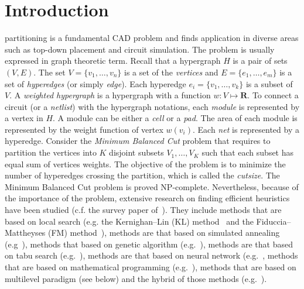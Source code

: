 \documentclass[journal]{IEEEtran}
\begin{document}
\section{Introduction}
 partitioning is a fundamental CAD problem and
finds application in diverse areas such as top-down placement and
circuit simulation. The problem is usually expressed in graph theoretic
term. Recall that a hypergraph $H$ is a pair of sets $(V,E)$. The set 
$V=\{v_1, \ldots, v_n\}$ is a set of the {\it vertices}  
and $E=\{e_1, \ldots, e_m\}$ is a set of {\it hyperedges} (or simply
{\it edge}). Each hyperedge $e_i = \{v_1, \ldots, v_k\}$ is a subset of
$V$. A {\it weighted hypergraph} is
a hypergraph with a function $w: V \mapsto \mathbf{R}$. To connect a
circuit (or a {\it netlist}) with the hypergraph notations, 
each {\it module} is represented by a
vertex in $H$. A module can be either a {\it cell} or a 
{\it pad}. The area of each module is represented by the weight
function of vertex $w(v_i)$. Each {\it net} is represented by a hyperedge. 
Consider the {\it Minimum Balanced Cut} problem that requires to
partition the vertices into $K$ disjoint subsets $V_1, \ldots, V_K$
such that each subset has equal sum of vertices weights.
The objective of the problem is to minimize the number
of hyperedges crossing the partition, which is called the {\it cutsize}.
The Minimum Balanced Cut problem is proved NP-complete.
Nevertheless, because of the importance of the problem,
extensive research on finding efficient heuristics have been studied 
(c.f. the survey paper of~\cite{survey_1995}). 
They include methods that are based on local search 
(e.g. the Kernighan--Lin (KL) method~\cite{KL_1970} 
and the Fiduccia--Mattheyses (FM) method~\cite{FM_1982}),  
methods are that based on simulated annealing
(e.g~\cite{simulated_evolution_1990}), 
methods that based on genetic algorithm 
(e.g.~\cite{adaptive_genetic_1999,genetic_1999}), 
methods are that based on tabu search 
(e.g.~\cite{tabu_1993}), 
methods are that based on neural network
(e.g.~\cite{hopfield_1994,neural_network_1995,neural_network_tcad_1990,stochastic_neural_network_1996},
methods that are based on mathematical programming 
(e.g.~\cite{gradient_FM_1995, eigenvector_1996}), 
methods that are based on multilevel paradigm (see below) 
and the hybrid of those methods (e.g.~\cite{hybrid_multilevel_genetic_1996}).
\end{document}
